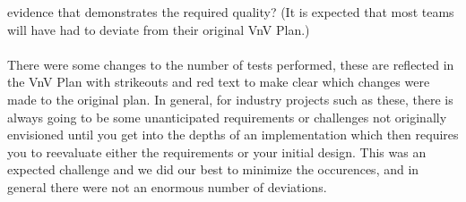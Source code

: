 \documentclass[12pt, titlepage]{article}
\begin{document}
\begin{enumerate}
    evidence that demonstrates the required quality?  (It is expected that most
    teams will have had to deviate from their original VnV Plan.)\\
    \\
    There were some changes to the number of tests performed, these
    are reflected in the VnV Plan with strikeouts and red text
    to make clear which changes were made to the original plan. In
    general, for industry projects such as these,
    there is always going to be some unanticipated requirements or
    challenges not originally envisioned until you get into the depths
    of an implementation which then requires you to reevaluate either
    the requirements or your initial design. This was an expected
    challenge and we did our best to minimize the occurences, and in
    general there were not an enormous number of deviations.
\end{enumerate}
\end{document}
